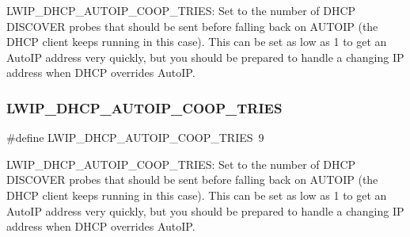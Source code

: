 L\+W\+I\+P\+\_\+\+D\+H\+C\+P\+\_\+\+A\+U\+T\+O\+I\+P\+\_\+\+C\+O\+O\+P\+\_\+\+T\+R\+I\+ES\+: Set to the number of D\+H\+CP D\+I\+S\+C\+O\+V\+ER probes that should be sent before falling back on A\+U\+T\+O\+IP (the D\+H\+CP client keeps running in this case). This can be set as low as 1 to get an Auto\+IP address very quickly, but you should be prepared to handle a changing IP address when D\+H\+CP overrides Auto\+IP. \mbox{\label{group__lwip__opts__autoip_ga4ff3f941b4c71a04b0c30fbee5b198c2}} 
\subsubsection{\texorpdfstring{L\+W\+I\+P\+\_\+\+D\+H\+C\+P\+\_\+\+A\+U\+T\+O\+I\+P\+\_\+\+C\+O\+O\+P\+\_\+\+T\+R\+I\+ES}{LWIP\_DHCP\_AUTOIP\_COOP\_TRIES}\hspace{0.1cm}{\footnotesize\ttfamily [2/2]}}
{\footnotesize\ttfamily \#define L\+W\+I\+P\+\_\+\+D\+H\+C\+P\+\_\+\+A\+U\+T\+O\+I\+P\+\_\+\+C\+O\+O\+P\+\_\+\+T\+R\+I\+ES~9}

L\+W\+I\+P\+\_\+\+D\+H\+C\+P\+\_\+\+A\+U\+T\+O\+I\+P\+\_\+\+C\+O\+O\+P\+\_\+\+T\+R\+I\+ES\+: Set to the number of D\+H\+CP D\+I\+S\+C\+O\+V\+ER probes that should be sent before falling back on A\+U\+T\+O\+IP (the D\+H\+CP client keeps running in this case). This can be set as low as 1 to get an Auto\+IP address very quickly, but you should be prepared to handle a changing IP address when D\+H\+CP overrides Auto\+IP. 